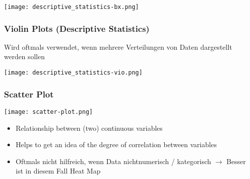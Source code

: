 \texttt{[image: descriptive\_statistics-bx.png]}

\subsubsection{Violin Plots (Descriptive Statistics)}

Wird oftmals verwendet, wenn mehrere Verteilungen von Daten dargestellt werden sollen

\texttt{[image: descriptive\_statistics-vio.png]}


\subsubsection{Scatter Plot}

\texttt{[image: scatter-plot.png]}

\begin{itemize}
    \item Relationship between (two) continuous variables
    \item Helps to get an idea of the degree of correlation between variables
    \item Oftmals nicht hilfreich, wenn Data nichtnumerisch / kategorisch $\rightarrow$ Besser ist in diesem Fall Heat Map
\end{itemize}
